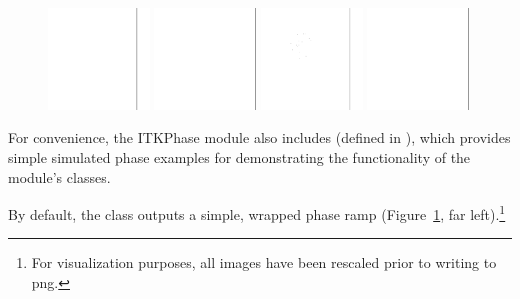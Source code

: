 \begin{figure}[h]
\center

\includegraphics[width=0.24\textwidth]{images/2/00a_ramp_wrapped.png}
\includegraphics[width=0.24\textwidth]{images/2/00b_ramp_unwrapped.png}
\includegraphics[width=0.24\textwidth]{images/2/00c_noise_wrapped.png}
\includegraphics[width=0.24\textwidth]{images/2/00d_noise_unwrapped.png}

\label{fig:Simulated_Phase_Examples}
\end{figure}

For convenience, the ITKPhase module also includes  (defined in ), which provides simple simulated phase examples for demonstrating the functionality of the module's classes.

By default, the class outputs a simple, wrapped phase ramp (Figure~\ref{fig:Simulated_Phase_Examples}, far left).\footnote{For visualization purposes, all images have been rescaled prior to writing to png.}


